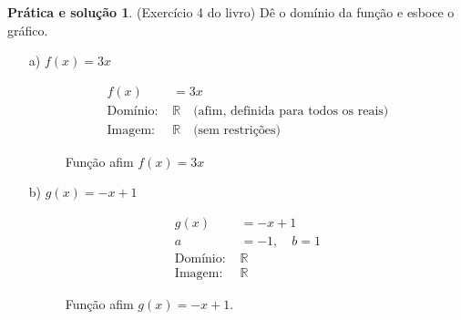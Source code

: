 \documentclass[12pt,openright,twoside,a4paper]{article}
\theoremstyle{definition}
\newtheorem{practice}{Prática e solução}[section]
\begin{document}
	\begin{practice}
		(Exercício 4 do livro) Dê o domínio da função e esboce o gráfico.
		
		\begin{enumerate}
			\item[a)] $f(x) = 3x$
			
			\begin{align*}
				f(x) &= 3x \\
				\text{Domínio: } &\mathbb{R} \quad \text{(afim, definida para todos os reais)} \\
				\text{Imagem: } &\mathbb{R} \quad \text{(sem restrições)}
			\end{align*}
			
			\begin{figure}[h]
				\centering
				\caption{Função afim $f(x) = 3x$}
			\end{figure}
			
			\item[b)] $g(x) = -x + 1$
			
			\begin{align*}
				g(x) &= -x + 1 \\
				a &= -1,\quad b = 1 \\
				\text{Domínio: } & \mathbb{R} \\
				\text{Imagem: } & \mathbb{R}
			\end{align*}
			
			\begin{figure}[h]
				\centering
				\caption{Função afim $g(x) = -x + 1$.}
				\label{fig:gx_negativo}
			\end{figure}
			

\end{enumerate}
\end{practice}
\end{document}
